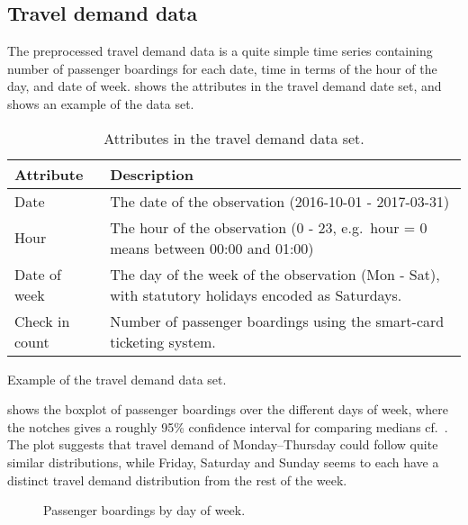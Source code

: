 \documentclass[a4paper,11pt]{article}
\begin{document}
\subsection{Travel demand data}\label{ch:desc_traveldemand}

The preprocessed travel demand data is a quite simple time series containing number of passenger boardings for each date, time in terms of the hour of the day, and date of week.  shows the attributes in the travel demand date set, and  shows an example of the data set.

\begin{table}[!ht]
    \center
    \begin{tabular}{p{1in}p{4in}}        
        Attribute & Description \\
        \hline 
        \hline         
        Date & The date of the observation (2016-10-01 - 2017-03-31) \\
        \hline 
        Hour & The hour of the observation (0 - 23, e.g.\ hour = 0 means between 00:00 and 01:00) \\
        \hline 
        Date of week & The day of the week of the observation (Mon - Sat), with statutory holidays encoded as Saturdays. \\
        \hline 
        Check in count & Number of passenger boardings using the smart-card ticketing system. \\
    \end{tabular}
    \caption{Attributes in the travel demand data set.}
    \label{tab:travel_demand_data_attr}
\end{table}

\begin{table}[!ht]
    \center
    
    \caption{Example of the travel demand data set.}
    \label{tab:travel_demand_data_example}
\end{table}


 shows the boxplot of passenger boardings over the different days of week, where the notches gives a roughly 95\% confidence interval for comparing medians cf.~\citet{Boxplots}. The plot suggests that travel demand of Monday--Thursday could follow quite similar distributions, while Friday, Saturday and Sunday seems to each have a distinct travel demand distribution from the rest of the week.

\clearpage
\begin{figure}[!ht]
    \center
    
    \caption{Passenger boardings by day of week.}
    \label{fig:travelcard_boxplot}
\end{figure}
\end{document}
